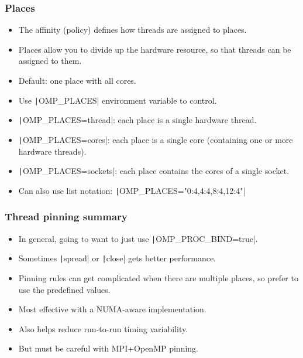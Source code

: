 \documentclass[aspectratio=169]{beamer}
\begin{document}
\begin{frame}
\frametitle{Places}
\begin{itemize}
  \item The affinity (policy) defines how threads are assigned to places.
  \item Places allow you to divide up the hardware resource, so that threads can be assigned to them.
  \item Default: one place with all cores.
  \item Use \texttt|OMP_PLACES| environment variable to control.
  \item \texttt|OMP_PLACES=thread|: each place is a single hardware thread.
  \item \texttt|OMP_PLACES=cores|: each place is a single core (containing one or more hardware threads).
  \item \texttt|OMP_PLACES=sockets|: each place contains the cores of a single socket.
  \item Can also use list notation: \texttt|OMP_PLACES="{0:4},{4:4},{8:4},{12:4}"|
\end{itemize}
\end{frame}

\begin{frame}
\frametitle{Thread pinning summary}
\begin{itemize}
  \item In general, going to want to just use \texttt|OMP_PROC_BIND=true|.
  \item Sometimes \texttt|spread| or \texttt|close| gets better performance.
  \item Pinning rules can get complicated when there are multiple places, so prefer to use the predefined values.
  \item Most effective with a NUMA-aware implementation.
  \item Also helps reduce run-to-run timing variability.
  \item But must be careful with MPI+OpenMP pinning.
\end{itemize}
\end{frame}

\end{document}
